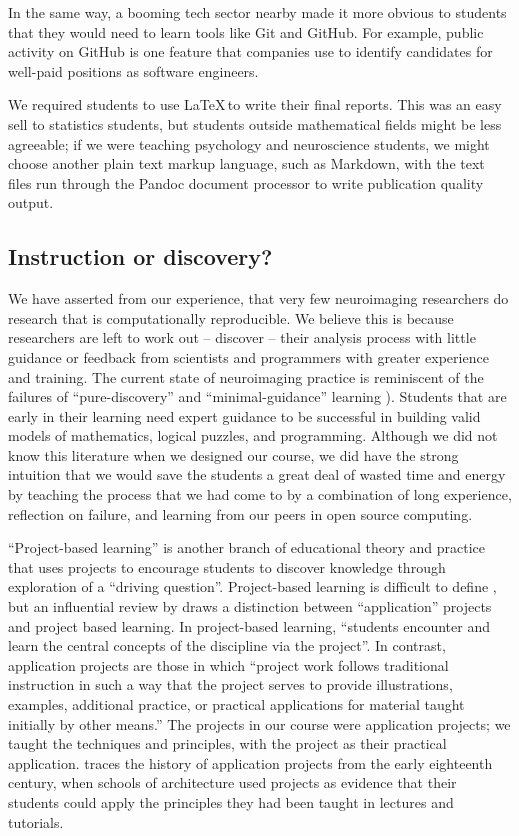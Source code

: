 In the same way, a booming tech sector nearby made it more obvious to students
that they would need to learn tools like Git and GitHub.
For example, public activity on GitHub is one
feature that companies use to identify candidates for well-paid positions as
software engineers.

We required students to use \LaTeX\,to write their final reports.  This was an
easy sell to statistics students, but students outside mathematical fields
might be less agreeable; if we were teaching psychology and neuroscience
students, we might choose another plain text markup language, such as
Markdown, with the text files run through the Pandoc document processor to
write publication quality output.

\subsection{Instruction or discovery?}

We have asserted from our experience, that very few neuroimaging researchers
do research that is computationally reproducible.  We believe this is because
researchers are left to work out -- discover -- their analysis process with
little guidance or feedback from scientists and programmers with greater
experience and training.  The current state of neuroimaging practice is
reminiscent of the failures of ``pure-discovery'' and ``minimal-guidance''
learning \citep{mayer2004strikes, kirschner2006minimal}).  Students that are
early in their learning need expert guidance to be successful in building
valid models of mathematics, logical puzzles, and programming.  Although we
did not know this literature when we designed our course, we did have the
strong intuition that we would save the students a great deal of wasted time
and energy by teaching the process that we had come to by a combination of
long experience, reflection on failure, and learning from our peers in open
source computing.

``Project-based learning'' is another branch of educational theory and
practice that uses projects to encourage students to discover knowledge
through exploration of a ``driving question''.  Project-based learning is
difficult to define \citep{condliffe2017project}, but an influential review by
\citet{thomas2000review} draws a distinction between ``application'' projects
and project based learning.  In project-based learning, ``students encounter
and learn the central concepts of the discipline via the project''.  In
contrast, application projects are those in which ``project work follows
traditional instruction in such a way that the project serves to provide
illustrations, examples, additional practice, or practical applications for
material taught initially by other means.''  The projects in our course were
application projects; we taught the techniques and principles, with the
project as their practical application. \citet{knoll2012mistake} traces the
history of application projects from the early eighteenth century, when
schools of architecture used projects as evidence that their students could
apply the principles they had been taught in lectures and tutorials.

